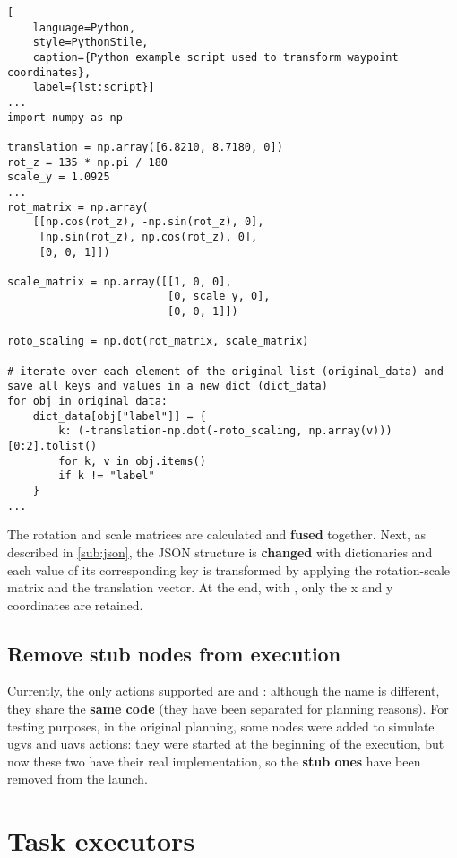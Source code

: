 \applymulticoltrue

\noindent\begin{lstlisting}[
    language=Python,
    style=PythonStile,
    caption={Python example script used to transform waypoint coordinates},
    label={lst:script}]
...
import numpy as np

translation = np.array([6.8210, 8.7180, 0])
rot_z = 135 * np.pi / 180
scale_y = 1.0925
...
rot_matrix = np.array(
    [[np.cos(rot_z), -np.sin(rot_z), 0],
     [np.sin(rot_z), np.cos(rot_z), 0],
     [0, 0, 1]])

scale_matrix = np.array([[1, 0, 0], 
                         [0, scale_y, 0],
                         [0, 0, 1]])

roto_scaling = np.dot(rot_matrix, scale_matrix)

# iterate over each element of the original list (original_data) and save all keys and values in a new dict (dict_data)
for obj in original_data:
    dict_data[obj["label"]] = {
        k: (-translation-np.dot(-roto_scaling, np.array(v)))[0:2].tolist()
        for k, v in obj.items()
        if k != "label"
    }
...
\end{lstlisting}

\applymulticolfalse

The rotation and scale matrices are calculated and \textbf{fused} together. Next, as described in \autoref{sub:json}, the JSON structure is \textbf{changed} with dictionaries and each value of its corresponding key is transformed by applying the rotation-scale matrix and the translation vector. At the end, with \code{[0:2]}, only the x and y coordinates are retained.

\subsection{Remove stub nodes from execution}

Currently, the only actions supported are  and : although the name is different, they share the \textbf{same code} (they have been separated for planning reasons). For testing purposes, in the original planning, some nodes were added to simulate \acrshort{ugvs} and \acrshort{uavs} actions: they were started at the beginning of the execution, but now these two have their real implementation, so the \textbf{stub ones} have been removed from the launch.

\section{Task executors}

